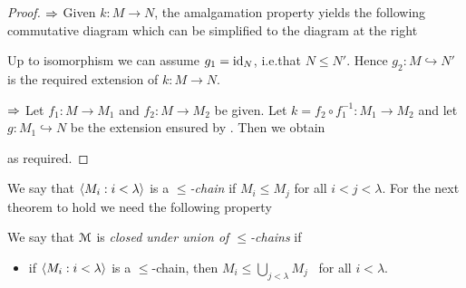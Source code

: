 \begin{proof}
$\Rightarrow$ Given $k:M\to N$, the amalgamation property yields the following commutative diagram which can be simplified to the diagram at the right

\hfil{}
\hfil{}

Up to isomorphism we can assume $g_1={\rm id}_N$, i.e.\@ that $N\le N'$.
Hence $g_2:M\hookrightarrow N'$ is the required extension of $k:M\to N$.

$\Rightarrow$ Let  $f_1:M\to M_1$ and $f_2:M\to M_2$ be given.
Let $k=f_2\circ f_1^{-1}:M_1\to M_2$ and let  $g:M_1\hookrightarrow N$ be the extension ensured by .
Then we obtain

\hfil{}

as required.
\end{proof}

We say that $\langle M_i:i<\lambda\rangle$ is a \emph{$\le$-chain\/} if $M_i\le M_j$ for all $i<j<\lambda$.
For the next theorem to hold we need the following property

\begin{definition}
We say that $\EuScript M$ is \emph{closed under union of $\le$-chains\/} if
\begin{itemize}
\item[c8.] if $\langle M_i:i<\lambda\rangle$ is a $\le$-chain,  then $\displaystyle M_i\le\bigcup_{j<\lambda}M_j$ \ for all $i<\lambda$.
\end{itemize}
\end{definition}

